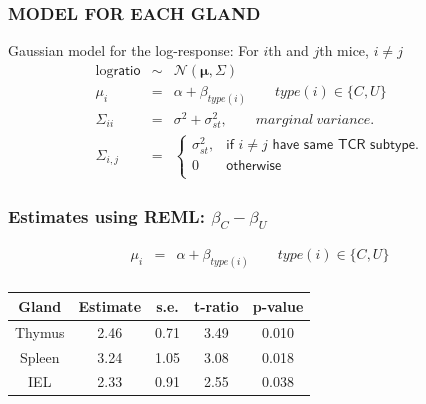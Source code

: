\documentclass{beamer}
\begin{document}
\begin{frame}
\frametitle{MODEL FOR EACH GLAND }
Gaussian model for the log-response:
For $i$th and $j$th mice, $i\neq j$
\begin{eqnarray*}
\log \textsf{ratio} & \sim & \mathcal{N}(\pmb\mu,\Sigma) \\
\mu_i & = & \alpha + \beta_{type(i)} \qquad type(i) \in \{C,U\} \\
\Sigma_{ii} & = & \sigma^2 + \sigma_{st}^2,	\qquad marginal~variance.\\
\Sigma_{i,j} & = & \begin{cases}
\sigma_{st}^2, & \textsf{if } i\neq j \textsf{ have same TCR subtype.}\\
0 & \textsf{otherwise} \\
                   \end{cases}
\end{eqnarray*}

\begin{center}
\end{center}
\end{frame}

\begin{frame}
\frametitle{Estimates using REML: $\beta_C-\beta_U$}
\begin{eqnarray*}
\mu_i & = & \alpha + \beta_{type(i)} \qquad type(i) \in \{C,U\} \\
\end{eqnarray*}

\begin{center}
\begin{tabular}{|c| c | c | c |  c|}\hline
Gland & Estimate & s.e. & t-ratio & p-value \\ \hline
Thymus & 2.46 & 0.71 & 3.49 &  0.010 \\ \hline
Spleen & 3.24 & 1.05 & 3.08 &  0.018 \\ \hline
IEL &  2.33 & 0.91 & 2.55 &   0.038 \\  \hline
\end{tabular}
\end{center}
\end{frame}
\end{document}
